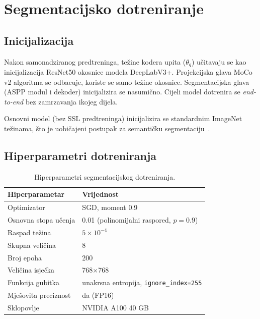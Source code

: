 \documentclass[diplomskirad]{fer}
\begin{document}
\section{Segmentacijsko dotreniranje}
\label{sec:finetuning}

\subsection{Inicijalizacija}

Nakon samonadziranog predtreninga, težine kodera upita ($\theta_q$) 
učitavaju se kao inicijalizacija ResNet50 okosnice modela DeepLabV3+. 
Projekcijska glava MoCo v2 algoritma se odbacuje, koriste se samo 
težine okosnice. Segmentacijska glava (ASPP modul i dekoder) 
inicijalizira se nasumično. Cijeli model dotrenira se \textit{end-to-end} 
bez zamrzavanja ikojeg dijela.

Osnovni model (bez SSL predtreninga) inicijalizira se standardnim 
ImageNet težinama, što je uobičajeni postupak za semantičku 
segmentaciju~\cite{he2016resnet}.

\subsection{Hiperparametri dotreniranja}

\begin{table}[H]
	\centering
	\caption{Hiperparametri segmentacijskog dotreniranja.}
	\label{tab:seg_hyperparams}
	\begin{tabular}{|l|l|}
		\hline
		\textbf{Hiperparametar} & \textbf{Vrijednost} \\
		\hline
		Optimizator         & SGD, moment 0.9 \\
		Osnovna stopa učenja & 0.01 (polinomijalni raspored, $p = 0.9$) \\
		Raspad težina       & $5 \times 10^{-4}$ \\
		Skupna veličina     & 8 \\
		Broj epoha          & 200 \\
		Veličina isječka    & 768$\times$768 \\
		Funkcija gubitka    & unakrsna entropija, \texttt{ignore\_index=255} \\
		Mješovita preciznost & da (FP16) \\
		Sklopovlje          & NVIDIA A100 40 GB \\
		\hline
	\end{tabular}
\end{table}
\end{document}
